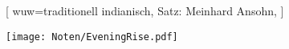 [
    wuw={traditionell indianisch, Satz: Meinhard Ansohn},
]

\beginverse
\endverse
\texttt{[image: Noten/EveningRise.pdf]}

\endsong

